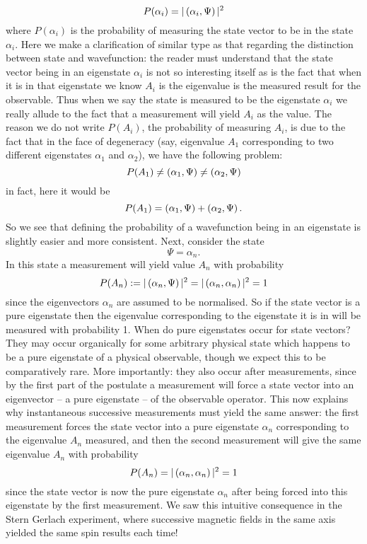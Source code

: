 $$
P(\alpha_{i})=|\left(\alpha_{i},\Psi\right)|^2
$$
where $P(\alpha_{i})$ is the probability of measuring the state vector to be in the state $\alpha_{i}$. Here we make a clarification of similar type as that regarding the distinction between state and wavefunction: the reader must understand that the state vector being in an eigenstate $\alpha_{i}$ is not so interesting itself as is the fact that when it is in that eigenstate we know $A_{i}$ is the eigenvalue is the measured result for the observable. Thus when we say the state is measured to be the eigenstate $\alpha_{i}$ we really allude to the fact that a measurement will yield $A_{i}$ as the value. The reason we do not write $P(A_{i})$, the probability of measuring $A_{i}$, is due to the fact that in the face of degeneracy (say, eigenvalue $A_{1}$ corresponding to two different eigenstates $\alpha_{1}$ and $\alpha_{2}$), we have the following problem:
$$
P(A_{1})\neq\left(\alpha_{1},\Psi\right)\neq\left(\alpha_{2},\Psi\right)
$$
in fact, here it would be 
$$
P(A_{1})=\left(\alpha_{1},\Psi\right)+\left(\alpha_{2},\Psi\right).
$$
So we see that defining the probability of a wavefunction being in an eigenstate is slightly easier and more consistent. Next,
consider the state 
$$
\Psi=\alpha_{n}.
$$
In this state a measurement will yield value $A_{n}$ with probability 
$$
P(A_{n}):=|\left(\alpha_{n},\Psi\right)|^2=|\left(\alpha_{n},\alpha_{n}\right)|^2=1
$$
since the eigenvectors $\alpha_{n}$ are assumed to be normalised. So if the state vector is a pure eigenstate then the eigenvalue corresponding to the eigenstate it is in will be measured with probability 1. When do pure eigenstates occur for state vectors? They may occur organically for some arbitrary physical state which happens to be a pure eigenstate of a physical observable, though we expect this to be comparatively rare. More importantly: they also occur after measurements, since by the first part of the postulate a measurement will force a state vector into an eigenvector -- a pure eigenstate -- of the observable operator. This now explains why instantaneous successive measurements must yield the same answer: the first measurement forces the state vector into a pure eigenstate $\alpha_{n}$ corresponding to the eigenvalue $A_{n}$ measured, and then the second measurement will give the same eigenvalue $A_{n}$ with probability
$$
P(A_{n})=|\left(\alpha_{n},\alpha_{n}\right)|^2=1
$$
since the state vector is now the pure eigenstate $\alpha_{n}$ after being forced into this eigenstate by the first measurement. We saw this intuitive consequence in the Stern Gerlach experiment, where successive magnetic fields in the same axis yielded the same spin results each time!
